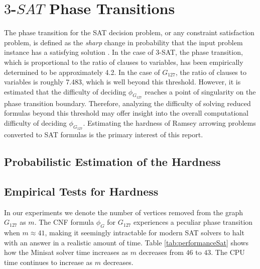 \documentclass[paper=a4, fontsize=11pt]{scrartcl} %
\newcommand{\TODO}{{\color{red}TODO}}
\begin{document}


\section{$3$-$SAT$ Phase Transitions}
The phase transition for the SAT decision problem, or any constraint satisfaction
problem, is defined as the \emph{sharp} change in probability that
the input problem instance has a satisfying solution \cite{3satphase}.
In the case of 3-SAT, the phase transition, which is proportional to the ratio of
clauses to variables, has been empirically determined to be approximately 4.2.
In the case of $G_{127}$, the ratio of clauses to variables is roughly 7.483, 
which is well beyond this threshold. However, it is estimated that
the difficulty of deciding $\phi_{G_{127}}$ reaches a point of singularity
on the phase transition boundary. Therefore, analyzing the difficulty of solving
reduced formulas beyond this threshold may offer insight into the overall computational 
difficulty of deciding $\phi_{G_{127}}$. 
Estimating the hardness of Ramsey arrowing problems converted to SAT formulas 
is the primary interest of this report. 


\subsection{Probabilistic Estimation of the Hardness}

\subsection{Empirical Tests for Hardness}
In our experiments we denote the number of vertices removed from the graph $G_{127}$ as $m$.
The CNF formula $\phi_G$ for $G_{127}$ experiences a peculiar phase transition when $m \approx 41$,
making it seemingly intractable for modern SAT solvers to halt with an answer in a realistic 
amount of time. Table \ref{tab:performanceSat} shows how the Minisat solver time increases 
as $m$ decreases from $46$ to $43$. The CPU time continues to increase as $m$ decreases.
\end{document}
